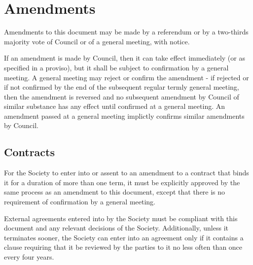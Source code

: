 \section{Amendments}
Amendments to this document may be made by a referendum or by a two-thirds
majority vote of Council or of a general meeting, with notice.

If an amendment is made by Council, then it can take effect immediately (or as
specified in a proviso), but it shall be subject to confirmation by a general
meeting. A general meeting may reject or confirm the amendment - if rejected
or if not confirmed by the end of the subsequent regular termly general meeting,
then the amendment is reversed and no subsequent amendment by Council of similar
substance has any effect until confirmed at a general meeting. An amendment
passed at a general meeting implictly confirms similar amendments by Council.

\subsection{Contracts}
For the Society to enter into or assent to an amendment to a contract
that binds it for a duration of more than one term, it must be explicitly
approved by the same process as an amendment to this document, except that there
is no requirement of confirmation by a general meeting.

External agreements entered into by the Society must be compliant with this
document and any relevant decisions of the Society. Additionally, unless it
terminates sooner, the Society can enter into an agreement only if it contains a
clause requiring that it be reviewed by the parties to it no less often than
once every four years.